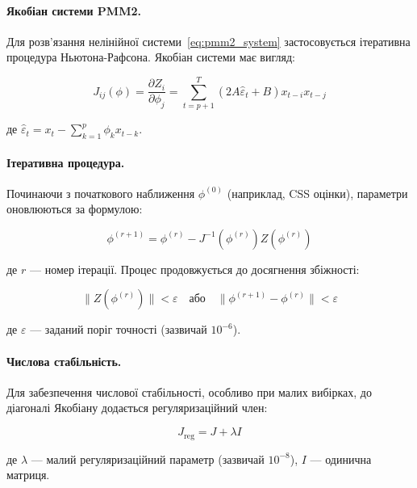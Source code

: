 \paragraph{Якобіан системи PMM2.}

Для розв'язання нелінійної системи~\eqref{eq:pmm2_system} застосовується ітеративна процедура Ньютона-Рафсона. Якобіан системи має вигляд:

\begin{equation}
\label{eq:jacobian}
J_{ij}(\phi) = \frac{\partial Z_i}{\partial \phi_j} = \sum_{t=p+1}^{T} (2A\hat{\varepsilon}_t + B) x_{t-i} x_{t-j}
\end{equation}

\noindent де $\hat{\varepsilon}_t = x_t - \sum_{k=1}^{p} \phi_k x_{t-k}$.

\paragraph{Ітеративна процедура.}

Починаючи з початкового наближення $\phi^{(0)}$ (наприклад, CSS оцінки), параметри оновлюються за формулою:

\begin{equation}
\label{eq:newton_raphson}
\phi^{(r+1)} = \phi^{(r)} - J^{-1}(\phi^{(r)}) Z(\phi^{(r)})
\end{equation}

\noindent де $r$ --- номер ітерації. Процес продовжується до досягнення збіжності:

\begin{equation}
\label{eq:convergence_criteria}
\|Z(\phi^{(r)})\| < \varepsilon \quad \text{або} \quad \|\phi^{(r+1)} - \phi^{(r)}\| < \varepsilon
\end{equation}

\noindent де $\varepsilon$ --- заданий поріг точності (зазвичай $10^{-6}$).

\paragraph{Числова стабільність.}

Для забезпечення числової стабільності, особливо при малих вибірках, до діагоналі Якобіану додається регуляризаційний член:

\begin{equation}
\label{eq:regularization}
J_{\text{reg}} = J + \lambda I
\end{equation}

\noindent де $\lambda$ --- малий регуляризаційний параметр (зазвичай $10^{-8}$), $I$ --- одинична матриця.

